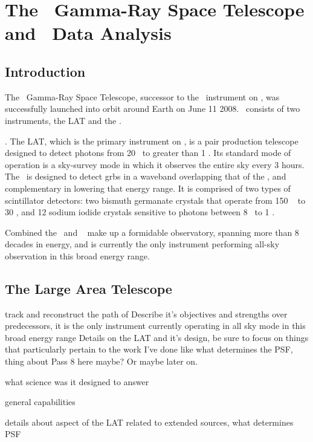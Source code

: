 \chapter{The \Fermi ~Gamma-Ray Space Telescope and \gam ~Data Analysis}
\label{chap:FGST}
\section{\label{sec:FGSTintro}Introduction}
The \Fermi~Gamma-Ray Space Telescope, successor to the \egret~instrument on \cgro, was successfully launched into orbit around Earth on June 11 2008. \Fermi ~consists of two instruments, the LAT and the \gbm.

 .  The LAT, which is the primary instrument on \Fermi, is a pair production telescope designed to detect photons from 20 \mev~to greater than 1 \tev. Its standard mode of operation is a sky-survey mode in which it observes the entire sky every 3 hours. The \gbm~is designed to detect \glspl{grb} in a waveband overlapping that of the \lat,  and complementary in lowering that energy range.  It is comprised of two types of scintillator detectors: two bismuth germanate crystals that operate from 150 \kev~ to 30 \mev, and 12 sodium iodide crystals sensitive to photons  between 8 \kev~to 1 \mev.

Combined the \lat~and \gbm~ make up a formidable observatory, spanning more than 8 decades in energy, and is  currently the only instrument performing all-sky observation in this broad energy range.


\section{\label{sec:FGSTLAT}The Large Area Telescope}

track and reconstruct the path of 
Describe it's objectives and strengths over predecessors, it is the only instrument currently operating in all sky mode in this broad energy range
Details on the LAT and it's design, be sure to focus on things that particularly pertain to the work I've done like what determines the PSF, thing about Pass 8 here maybe? Or maybe later on. 

what science was it designed to answer

general capabilities

details about aspect of the LAT related to extended sources, what determines PSF

